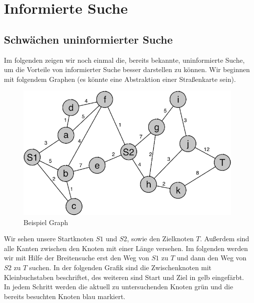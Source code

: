 
\chapter{Informierte Suche}

\section{Schw\"achen uninformierter Suche}
Im folgenden zeigen wir noch einmal die, bereits bekannte, uninformierte Suche, um die Vorteile von informierter Suche besser darstellen zu k\"onnen. Wir beginnen mit folgendem Graphen (es k\"onnte eine Abstraktion einer Stra\ss enkarte sein). 

\begin{figure}[h!]
	\centering
	\includegraphics[scale=0.9]{chapters/informed_search/Anfangsproblem.png}
	\caption{Beispiel Graph}
\end{figure}

Wir sehen unsere Startknoten $S1$ und $S2$, sowie den Zielknoten $T$.  Au\ss erdem sind alle Kanten zwischen den Knoten mit einer L\"ange versehen. Im folgenden werden wir mit Hilfe der Breitensuche erst den Weg von $S1$ zu $T$ und dann den Weg von $S2$ zu $T$ suchen. In der folgenden Grafik sind die Zwischenknoten mit Kleinbuchstaben beschriftet, des weiteren sind Start und Ziel in gelb eingef\"arbt. In jedem Schritt werden die aktuell zu untersuchenden Knoten gr\"un und die bereits besuchten Knoten blau markiert.

